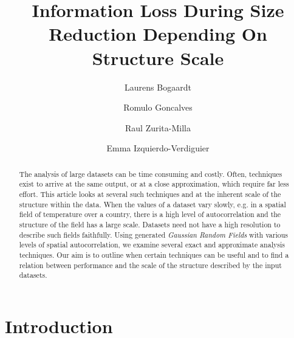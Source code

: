 \documentclass{acm_proc_article-sp}
\begin{document}
\title{\textbf{Information Loss During Size Reduction Depending On Structure Scale}}

\author[1]{Laurens Bogaardt}
\author[1]{Romulo Goncalves}
\author[2]{Raul Zurita-Milla}
\author[2,3]{Emma Izquierdo-Verdiguier}


\date{} %
\maketitle
\thispagestyle{empty} %

\begin{abstract}
The analysis of large datasets can be time consuming and costly. Often, techniques exist to arrive at the same output, or at a close approximation, which require far less effort. This article looks at several such techniques and at the inherent scale of the structure within the data. When the values of a dataset vary slowly, e.g. in a spatial field of temperature over a country, there is a high level of autocorrelation and the structure of the field has a large scale. Datasets need not have a high resolution to describe such fields faithfully. Using generated \textit{Gaussian Random Fields} with various levels of spatial autocorrelation, we examine several exact and approximate analysis techniques. Our aim is to outline when certain techniques can be useful and to find a relation between performance and the scale of the structure described by the input datasets.\\ %
\end{abstract}

\section{Introduction}
\label{sec:Introduction} %
\end{document}
